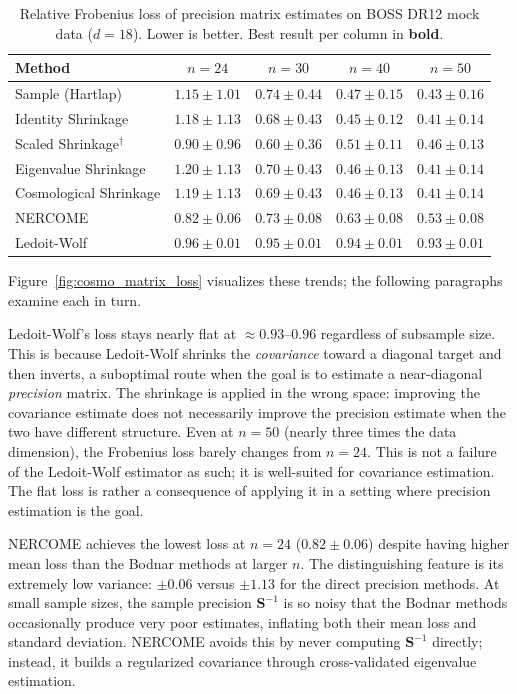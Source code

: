 \begin{table}[t]
\centering
\caption{Relative Frobenius loss of precision matrix estimates on BOSS DR12 mock data ($d = 18$). Lower is better. Best result per column in \textbf{bold}.}
\label{tab:cosmo_direct}
\begin{tabular}{@{}lcccc@{}}
\toprule
Method & $n = 24$ & $n = 30$ & $n = 40$ & $n = 50$ \\
\midrule
Sample (Hartlap)         & $1.15 \pm 1.01$ & $0.74 \pm 0.44$ & $0.47 \pm 0.15$ & $0.43 \pm 0.16$ \\
Identity Shrinkage       & $1.18 \pm 1.13$ & $0.68 \pm 0.43$ & $\mathbf{0.45 \pm 0.12}$ & $\mathbf{0.41 \pm 0.14}$ \\
Scaled Shrinkage$^\dagger$ & $0.90 \pm 0.96$ & $\mathbf{0.60 \pm 0.36}$ & $0.51 \pm 0.11$ & $0.46 \pm 0.13$ \\
Eigenvalue Shrinkage     & $1.20 \pm 1.13$ & $0.70 \pm 0.43$ & $0.46 \pm 0.13$ & $\mathbf{0.41 \pm 0.14}$ \\
Cosmological Shrinkage   & $1.19 \pm 1.13$ & $0.69 \pm 0.43$ & $0.46 \pm 0.13$ & $\mathbf{0.41 \pm 0.14}$ \\
NERCOME                  & $\mathbf{0.82 \pm 0.06}$ & $0.73 \pm 0.08$ & $0.63 \pm 0.08$ & $0.53 \pm 0.08$ \\
Ledoit-Wolf              & $0.96 \pm 0.01$ & $0.95 \pm 0.01$ & $0.94 \pm 0.01$ & $0.93 \pm 0.01$ \\
\bottomrule
\end{tabular}
\end{table}

Figure~\ref{fig:cosmo_matrix_loss} visualizes these trends; the following paragraphs examine each in turn.

Ledoit-Wolf's loss stays nearly flat at $\approx 0.93$--$0.96$ regardless of subsample size. This is because Ledoit-Wolf shrinks the \emph{covariance} toward a diagonal target and then inverts, a suboptimal route when the goal is to estimate a near-diagonal \emph{precision} matrix. The shrinkage is applied in the wrong space: improving the covariance estimate does not necessarily improve the precision estimate when the two have different structure. Even at $n = 50$ (nearly three times the data dimension), the Frobenius loss barely changes from $n = 24$. This is not a failure of the Ledoit-Wolf estimator as such; it is well-suited for covariance estimation. The flat loss is rather a consequence of applying it in a setting where precision estimation is the goal.

NERCOME achieves the lowest loss at $n = 24$ ($0.82 \pm 0.06$) despite having higher mean loss than the Bodnar methods at larger $n$. The distinguishing feature is its extremely low variance: $\pm 0.06$ versus $\pm 1.13$ for the direct precision methods. At small sample sizes, the sample precision $\mathbf{S}^{-1}$ is so noisy that the Bodnar methods occasionally produce very poor estimates, inflating both their mean loss and standard deviation. NERCOME avoids this by never computing $\mathbf{S}^{-1}$ directly; instead, it builds a regularized covariance through cross-validated eigenvalue estimation.

